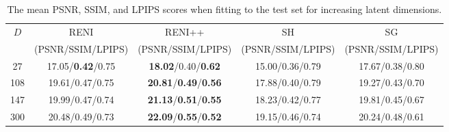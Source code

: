 \begin{table}
\begin{center}
\caption{The mean PSNR, SSIM, and LPIPS scores when fitting to the test set for increasing latent dimensions.}
\label{tab:comparison_PSNR_SSIM_LPIPS}
\begin{tabular}{| c | c | c | c | c |}
\hline
$D$ & RENI & RENI++ & SH & SG \\
& (PSNR/SSIM/LPIPS) & (PSNR/SSIM/LPIPS) & (PSNR/SSIM/LPIPS) & (PSNR/SSIM/LPIPS) \\
\hline
27 & 17.05/\textbf{0.42}/0.75 & \textbf{18.02}/0.40/\textbf{0.62} & 15.00/0.36/0.79 & 17.67/0.38/0.80 \\ \hline
108 & 19.61/0.47/0.75 & \textbf{20.81}/\textbf{0.49}/\textbf{0.56} & 17.88/0.40/0.79 & 19.27/0.43/0.70 \\ \hline
147 & 19.99/0.47/0.74 & \textbf{21.13}/\textbf{0.51}/\textbf{0.55} & 18.23/0.42/0.77 & 19.81/0.45/0.67 \\ \hline
300 & 20.48/0.49/0.73 & \textbf{22.09}/\textbf{0.55}/\textbf{0.52} & 19.15/0.46/0.74 & 20.24/0.48/0.61 \\ \hline
\end{tabular}
\end{center}
\end{table}
